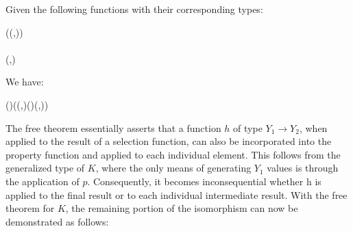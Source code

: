 \begin{theorem}
Given the following functions with their corresponding types:

\begin{hscode}\SaveRestoreHook
{}%
%
\>[B]{}\mathbin{::}\;\mathbin{\circ}(\to (,))\to {}\<[E]%
\\
\>[B]{}\mathbin{::}\to {}\<[E]%
\\
\>[B]{}\mathbin{::}\to (,){}\<[E]%
\ColumnHook
\end{hscode}\resethooks

We have:

\begin{hscode}\SaveRestoreHook
{}%
%
\>[B]{}\;(\;)\mathrel{=}\;(\lambda {}\to {}\;(,)\mathrel{=}(\;)\;\;(,\;)){}\<[E]%
\ColumnHook
\end{hscode}\resethooks

\end{theorem}
The free theorem essentially asserts that a function $h$ of type $Y_1 \rightarrow Y_2$, 
when applied to the result of a selection function, can also be incorporated into the 
property function and applied to each individual element. This follows from the 
generalized type of $K$, where the only means of generating $Y_1$ values is through the 
application of $p$. Consequently, it becomes inconsequential whether h is applied to the 
final result or to each individual intermediate result.
With the free theorem for $K$, the remaining portion of the isomorphism can now be 
demonstrated as follows:

